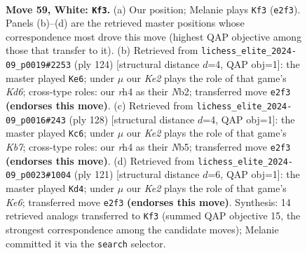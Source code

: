 \documentclass[11pt]{article}
\begin{document}
\clearpage

\begin{figure}[p]\centering
\begin{subfigure}{0.46\textwidth}\centering
\resizebox{\linewidth}{!}{%
\newchessgame
\chessboard[
  setfen={8/p2p4/2p5/5k2/7r/8/4K3/8 w - - 4 59},
  showmover=false,
  pgfstyle=straightmove, color=movearrow, markmove={e2-f3}
]}
\caption{}
\end{subfigure}\hfill
\begin{subfigure}{0.46\textwidth}\centering
\resizebox{\linewidth}{!}{%
\newchessgame
\chessboard[
  setfen={8/6p1/3K3p/8/6k1/8/1N6/8 w - - 2 63},
  showmover=false,
  pgfstyle=straightmove, color=movearrow, markmove={d6-e6}
]}
\caption{}
\end{subfigure}
\\[4pt]
\begin{subfigure}{0.46\textwidth}\centering
\resizebox{\linewidth}{!}{%
\newchessgame
\chessboard[
  setfen={8/1K3p2/6p1/1N6/5k2/8/8/8 w - - 1 65},
  showmover=false,
  pgfstyle=straightmove, color=movearrow, markmove={b7-c6}
]}
\caption{}
\end{subfigure}\hfill
\begin{subfigure}{0.46\textwidth}\centering
\resizebox{\linewidth}{!}{%
\newchessgame
\chessboard[
  setfen={8/8/1K6/8/P7/1P2k3/8/8 b - - 2 61},
  showmover=false,
  pgfstyle=straightmove, color=movearrow, markmove={e3-d4}
]}
\caption{}
\end{subfigure}
\caption{\textbf{Move 59, White: \texttt{Kf3}.} (a) Our position; Melanie plays \texttt{Kf3} (\texttt{e2f3}). Panels (b)--(d) are the retrieved master positions whose correspondence most drove this move (highest QAP objective among those that transfer to it). (b) Retrieved from \texttt{lichess\_elite\_2024-09\_p0019\#2253} (ply 124) [structural distance $d$=4, QAP obj=1]: the master played \texttt{Ke6}; under $\mu$ our \emph{Ke2} plays the role of that game's \emph{Kd6}; cross-type roles: our \emph{r}h4 as their \emph{N}b2; transferred move \texttt{e2f3} \textbf{(endorses this move)}. (c) Retrieved from \texttt{lichess\_elite\_2024-09\_p0016\#243} (ply 128) [structural distance $d$=4, QAP obj=1]: the master played \texttt{Kc6}; under $\mu$ our \emph{Ke2} plays the role of that game's \emph{Kb7}; cross-type roles: our \emph{r}h4 as their \emph{N}b5; transferred move \texttt{e2f3} \textbf{(endorses this move)}. (d) Retrieved from \texttt{lichess\_elite\_2024-09\_p0023\#1004} (ply 121) [structural distance $d$=6, QAP obj=1]: the master played \texttt{Kd4}; under $\mu$ our \emph{Ke2} plays the role of that game's \emph{Ke6}; transferred move \texttt{e2f3} \textbf{(endorses this move)}. Synthesis: 14 retrieved analogs transferred to \texttt{Kf3} (summed QAP objective 15, the strongest correspondence among the candidate moves); Melanie committed it via the \texttt{search} selector.}
\label{fig:thought-m116}
\end{figure}
\end{document}
